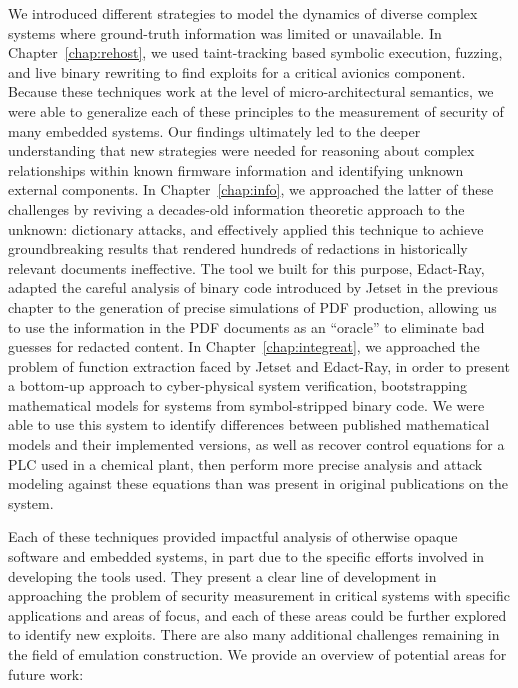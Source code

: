 We introduced different strategies to model the dynamics of diverse complex systems where ground-truth information was limited or unavailable.
In Chapter~\ref{chap:rehost}, we used taint-tracking based symbolic execution, fuzzing, and live binary rewriting to find exploits for a critical avionics component.
Because these techniques work at the level of micro-architectural semantics, we were able to generalize each of these principles to the measurement of security of many embedded systems.
Our findings ultimately led to the deeper understanding that new strategies were needed for reasoning about complex relationships within known firmware information and identifying unknown external components.
In Chapter~\ref{chap:info}, we approached the latter of these challenges by reviving a decades-old information theoretic approach to the unknown: dictionary attacks, and effectively applied this technique to achieve groundbreaking results that rendered hundreds of redactions in historically relevant documents ineffective.
The tool we built for this purpose, Edact-Ray, adapted the careful analysis of binary code introduced by Jetset in the previous chapter to the generation of precise simulations of PDF production, allowing us to use the information in the PDF documents as an ``oracle'' to eliminate bad guesses for redacted content.
In Chapter~\ref{chap:integreat}, we approached the problem of function extraction faced by Jetset and Edact-Ray, in order to present a bottom-up approach to cyber-physical system verification, bootstrapping mathematical models for systems from symbol-stripped binary code.
We were able to use this system to identify differences between published mathematical models and their implemented versions, as well as recover control equations for a PLC used in a chemical plant, then perform more precise analysis and attack modeling against these equations than was present in original publications on the system.

Each of these techniques provided impactful analysis of otherwise opaque software and embedded systems, in part due to the specific efforts involved in developing the tools used.
They present a clear line of development in approaching the problem of security measurement in critical systems with specific applications and areas of focus, and each of these areas could be further explored to identify new exploits.
There are also many additional challenges remaining in the field of emulation construction.
We provide an overview of potential areas for future work:

